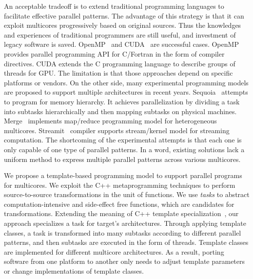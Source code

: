 An acceptable tradeoff is to extend traditional programming
languages to facilitate effective parallel patterns. The advantage of
this strategy is that it can exploit multicores progressively based on
original sources. Thus the
knowledges and
experiences of traditional programmers are still useful, and investment
of legacy software is saved. OpenMP~\cite{openmp}  and
CUDA~\cite{cuda} are successful cases. OpenMP provides parallel
programming API for C/Fortran in the form of compiler directives. CUDA
extends the C programming language to describe
groups of threads for GPU. The limitation is that those approaches
depend on specific platforms or vendors. On the other side, many experimental
programming models are proposed to support multiple architectures in recent years.
Sequoia~\cite{sequoia} attempts to program for memory hierarchy. It
achieves parallelization by dividing a task into subtasks
hierarchically and then mapping
subtasks on physical machines. Merge~\cite{merge} implements
map/reduce programming model for heterogeneous
multicores. Streamit~\cite{ThiesKA02} compiler supports stream/kernel
model for streaming computation. The shortcoming of the experimental
attempts is that each one
is only capable of one type of parallel patterns.  In a word, existing solutions
lack a uniform method to express multiple parallel patterns
across various multicores.


We propose a template-based programming model to
support parallel programs for multicores. We exploit the C++
metaprogramming techniques to perform source-to-source transformations
in the unit of functions. We use \emph{tasks} to abstract
computation-intensive and side-effect free functions, which are
candidates for transformations. Extending the meaning of C++ template
specialization~\cite{tcpl},  our approach specializes a task for target's
architectures.  Through applying template classes, a task is
transformed into many subtasks according to different parallel
patterns, and then subtasks are executed in the form of threads.
Template classes are implemented for different multicore
architectures. As a result, porting software from one platform to another only
needs to adjust template parameters or change implementations of
template classes. 

